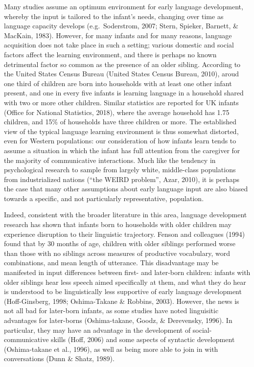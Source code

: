 \documentclass[man,floatsintext]{apa6}
\begin{document}
Many studies assume an optimum environment for early language development, whereby the input is tailored to the infant's needs, changing over time as language capacity develops (e.g.~Soderstrom, 2007; Stern, Spieker, Barnett, \& MacKain, 1983). However, for many infants and for many reasons, language acquisition does not take place in such a setting; various domestic and social factors affect the learning environment, and there is perhaps no known detrimental factor so common as the presence of an older sibling. According to the United States Census Bureau (United States Census Bureau, 2010), aroud one third of children are born into households with at least one other infant present, and one in every five infants is learning language in a household shared with two or more other children. Similar statistics are reported for UK infants (Office for National Statistics, 2018), where the average household has 1.75 children, and 15\% of households have three children or more. The established view of the typical language learning environment is thus somewhat distorted, even for Western populations: our consideration of how infants learn tends to assume a situation in which the infant has full attention from the caregiver for the majority of communicative interactions. Much like the tendency in psychological research to sample from largely white, middle-class populations from industrialized nations (``the WEIRD problem'', Azar, 2010), it is perhaps the case that many other assumptions about early language input are also biased towards a specific, and not particularly representative, population.

Indeed, consistent with the broader literature in this area, language development research has shown that infants born to households with older children may experience disruption to their linguistic trajectory. Fenson and colleagues (1994) found that by 30 months of age, children with older siblings performed worse than those with no siblings across measures of productive vocabulary, word combinations, and mean length of utterance. This disadvantage may be manifested in input differences between first- and later-born children: infants with older siblings hear less speech aimed specifically at them, and what they do hear is understood to be linguistically less supportive of early language development (Hoff-Ginsberg, 1998; Oshima-Takane \& Robbins, 2003). However, the news is not all bad for later-born infants, as some studies have noted linguisitic advantages for later-borns (Oshima-takane, Goodz, \& Derevensky, 1996). In particular, they may have an advantage in the development of social-communicative skills (Hoff, 2006) and some aspects of syntactic development (Oshima-takane et al., 1996), as well as being more able to join in with conversations (Dunn \& Shatz, 1989).
\end{document}
